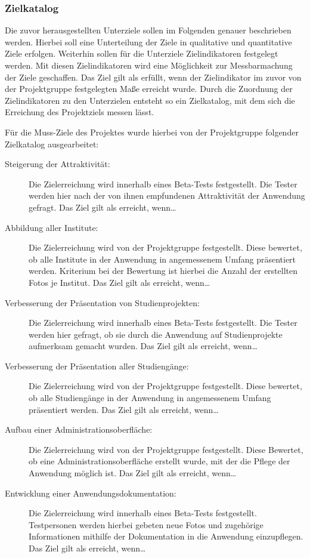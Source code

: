 \subsubsection{Zielkatalog}
\label{sec:Zielkatalog}

Die zuvor herausgestellten Unterziele sollen im Folgenden genauer beschrieben
werden. Hierbei soll eine Unterteilung der Ziele in qualitative und quantitative
Ziele erfolgen. Weiterhin sollen für die Unterziele Zielindikatoren festgelegt
werden. Mit diesen Zielindikatoren wird eine Möglichkeit zur Messbarmachung der
Ziele geschaffen. Das Ziel gilt als erfüllt, wenn der Zielindikator im zuvor von
der Projektgruppe festgelegten Maße erreicht wurde. Durch die Zuordnung der
Zielindikatoren zu den Unterzielen entsteht so ein Zielkatalog, mit dem sich
die Erreichung des Projektziels messen lässt.

Für die Muss-Ziele des Projektes wurde hierbei von der Projektgruppe folgender
Zielkatalog ausgearbeitet:



\begin{description}
	\item[Steigerung der Attraktivität:] Die Zielerreichung wird innerhalb eines
	Beta-Tests festgestellt. Die Tester werden hier nach der von ihnen empfundenen
	Attraktivität der Anwendung gefragt. Das Ziel gilt als erreicht, wenn\ldots
	\item[Abbildung aller Institute:] Die Zielerreichung wird von der Projektgruppe
	festgestellt. Diese bewertet, ob alle Institute in der Anwendung in
	angemessenem Umfang präsentiert werden. Kriterium bei der Bewertung ist hierbei
	die Anzahl der erstellten Fotos je Institut. Das Ziel gilt als erreicht,
	wenn\ldots
	\item[Verbesserung der Präsentation von Studienprojekten:] Die Zielerreichung
	wird innerhalb eines Beta-Tests festgestellt. Die Tester werden hier gefragt,
	ob sie durch die Anwendung auf Studienprojekte aufmerksam gemacht wurden. Das
	Ziel gilt als erreicht, wenn\ldots
	\item[Verbesserung der Präsentation aller Studiengänge:] Die Zielerreichung
	wird von der Projektgruppe festgestellt. Diese bewertet, ob alle Studiengänge
	in der Anwendung in angemessenem Umfang präsentiert werden. Das Ziel gilt als
	erreicht, wenn\ldots
	\item[Aufbau einer Administrationsoberfläche:] Die Zielerreichung wird von der
	Projektgruppe festgestellt. Diese Bewertet, ob eine Administrationsoberfläche
	erstellt wurde, mit der die Pflege der Anwendung möglich ist. Das Ziel gilt als
	erreicht, wenn\ldots
	\item[Entwicklung einer Anwendungsdokumentation:] Die Zielerreichung wird
	innerhalb eines Beta-Tests festgestellt. Testpersonen werden hierbei gebeten
	neue Fotos und zugehörige Informationen mithilfe der Dokumentation in die
	Anwendung einzupflegen. Das Ziel gilt als erreicht, wenn\ldots
	\end{description}
	
